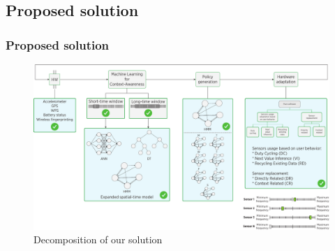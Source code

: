\documentclass[compress,9pt,xcolor={dvipsnames,table}]{beamer}
\begin{document}
\subsection{Proposed solution}
\begin{frame}[t]\frametitle{Proposed solution}
\begin{figure}[tb]
  \centering
  \includegraphics[width=\textwidth]{../../../resources/images/vectors/dual-taxonomy-ours}
  \caption{Decomposition of our solution}
  \label{fig:dual-taxonomy-ours}
  \end{figure}

\end{frame}
\end{document}
